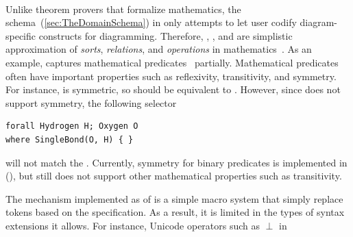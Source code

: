 \paragraph{\inlineDSL{\Domain{}}} Unlike theorem provers that formalize mathematics, the \Domain{} schema~(\cref{sec:TheDomainSchema}) in \Penrose{} only attempts to let user codify diagram-specific constructs for diagramming. Therefore, , , and  are simplistic approximation of \emph{sorts}, \emph{relations}, and \emph{operations} in mathematics~\cite{avigad_design_2020}. As an example, \Domain{}  captures mathematical predicates~\cite{stoll_set_2012} partially. Mathematical predicates often have important properties such as reflexivity, transitivity, and symmetry. For instance,  is symmetric, so  should be equivalent to . However, since \Penrose{} does not support symmetry, the following selector 

\begin{center}
\begin{mdframed}[style=STYCode]
\begin{lstlisting}[language=Sty-Chem-new,escapechar=@]
forall Hydrogen H; Oxygen O 
where SingleBond(O, H) { }
\end{lstlisting}
\end{mdframed}
\end{center}

\noindent will not match the . Currently, symmetry for binary predicates is implemented in \Penrose{} (), but \Penrose{} still does not support other mathematical properties such as transitivity.

The  mechanism implemented as of \cite{penrose} is a simple macro system that simply replace tokens based on the specification. As a result, it is limited in the types of syntax extensions it allows. For instance, Unicode operators such as $\perp$ in 

\begin{center}
\end{center}

